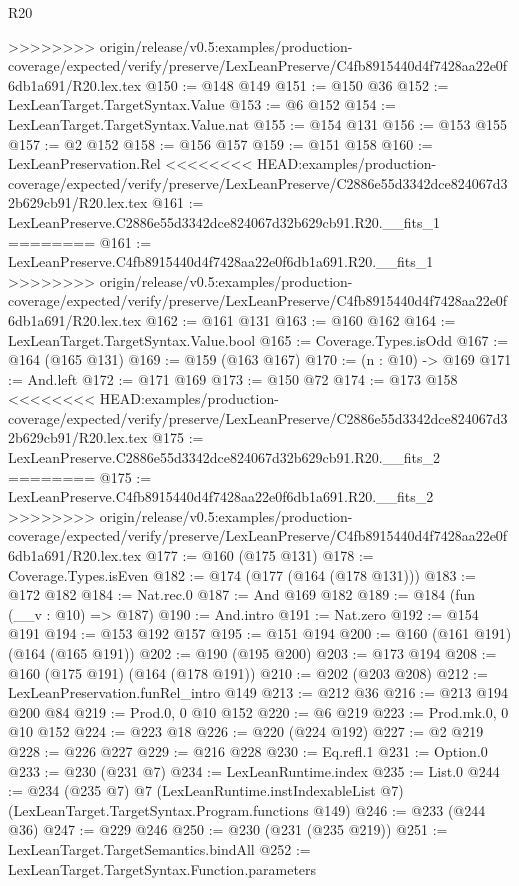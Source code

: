 \begin{lexlean}{R20}
\begin{coremodule}
{{{{{{{{{{{>>>>>>>> origin/release/v0.5:examples/production-coverage/expected/verify/preserve/LexLeanPreserve/C4fb8915440d4f7428aa22e0f6db1a691/R20.lex.tex
@150 := @148 @149
@151 := @150 @36
@152 := LexLeanTarget.TargetSyntax.Value
@153 := @6 @152
@154 := LexLeanTarget.TargetSyntax.Value.nat
@155 := @154 @131
@156 := @153 @155
@157 := @2 @152
@158 := @156 @157
@159 := @151 @158
@160 := LexLeanPreservation.Rel
<<<<<<<< HEAD:examples/production-coverage/expected/verify/preserve/LexLeanPreserve/C2886e55d3342dce824067d32b629cb91/R20.lex.tex
@161 := LexLeanPreserve.C2886e55d3342dce824067d32b629cb91.R20.__fits_1
========
@161 := LexLeanPreserve.C4fb8915440d4f7428aa22e0f6db1a691.R20.__fits_1
>>>>>>>> origin/release/v0.5:examples/production-coverage/expected/verify/preserve/LexLeanPreserve/C4fb8915440d4f7428aa22e0f6db1a691/R20.lex.tex
@162 := @161 @131
@163 := @160 @162
@164 := LexLeanTarget.TargetSyntax.Value.bool
@165 := Coverage.Types.isOdd
@167 := @164 (@165 @131)
@169 := @159 (@163 @167)
@170 := (n : @10) -> @169
@171 := And.left
@172 := @171 @169
@173 := @150 @72
@174 := @173 @158
<<<<<<<< HEAD:examples/production-coverage/expected/verify/preserve/LexLeanPreserve/C2886e55d3342dce824067d32b629cb91/R20.lex.tex
@175 := LexLeanPreserve.C2886e55d3342dce824067d32b629cb91.R20.__fits_2
========
@175 := LexLeanPreserve.C4fb8915440d4f7428aa22e0f6db1a691.R20.__fits_2
>>>>>>>> origin/release/v0.5:examples/production-coverage/expected/verify/preserve/LexLeanPreserve/C4fb8915440d4f7428aa22e0f6db1a691/R20.lex.tex
@177 := @160 (@175 @131)
@178 := Coverage.Types.isEven
@182 := @174 (@177 (@164 (@178 @131)))
@183 := @172 @182
@184 := Nat.rec.{0}
@187 := And @169 @182
@189 := @184 (fun (__v : @10) => @187)
@190 := And.intro
@191 := Nat.zero
@192 := @154 @191
@194 := @153 @192 @157
@195 := @151 @194
@200 := @160 (@161 @191) (@164 (@165 @191))
@202 := @190 (@195 @200)
@203 := @173 @194
@208 := @160 (@175 @191) (@164 (@178 @191))
@210 := @202 (@203 @208)
@212 := LexLeanPreservation.funRel_intro @149
@213 := @212 @36
@216 := @213 @194 @200 @84
@219 := Prod.{0, 0} @10 @152
@220 := @6 @219
@223 := Prod.mk.{0, 0} @10 @152
@224 := @223 @18
@226 := @220 (@224 @192)
@227 := @2 @219
@228 := @226 @227
@229 := @216 @228
@230 := Eq.refl.{1}
@231 := Option.{0}
@233 := @230 (@231 @7)
@234 := LexLeanRuntime.index
@235 := List.{0}
@244 := @234
    (@235 @7)
    @7
    (LexLeanRuntime.instIndexableList @7)
    (LexLeanTarget.TargetSyntax.Program.functions @149)
@246 := @233 (@244 @36)
@247 := @229 @246
@250 := @230 (@231 (@235 @219))
@251 := LexLeanTarget.TargetSemantics.bindAll
@252 := LexLeanTarget.TargetSyntax.Function.parameters
}}}}}}}}}}}
\end{coremodule}
\end{lexlean}
